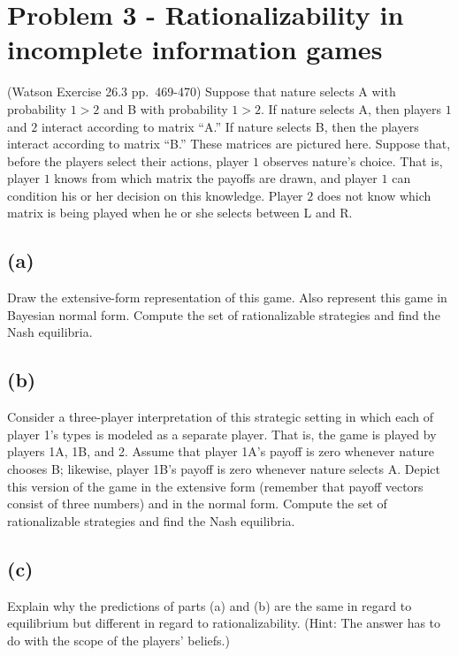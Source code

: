 \documentclass{article}
\begin{document}
\section{Problem 3 - Rationalizability in incomplete information games}

(Watson Exercise 26.3 pp.~469-470)
Suppose that nature selects A with probability $1>2$ and B with probability
$1>2$. If nature selects A, then players $1$ and $2$ interact according to matrix
``A.'' If nature selects B, then the players interact according to matrix ``B.''
These matrices are pictured here. Suppose that, before the players select
their actions, player $1$ observes nature's choice. That is, player $1$ knows
from which matrix the payoffs are drawn, and player $1$ can condition his
or her decision on this knowledge. Player $2$ does not know which matrix is
being played when he or she selects between L and R.

\subsection*{(a)} Draw the extensive-form representation of this game. Also represent
this game in Bayesian normal form. Compute the set of rationalizable
strategies and find the Nash equilibria.



\subsection*{(b)} Consider a three-player interpretation of this strategic setting in which each of player 1's types is modeled as a separate player. That is, the
game is played by players 1A, 1B, and 2. Assume that player 1A's
payoff is zero whenever nature chooses B; likewise, player 1B's payoff
is zero whenever nature selects A. Depict this version of the game in the
extensive form (remember that payoff vectors consist of three numbers)
and in the normal form. Compute the set of rationalizable strategies and
find the Nash equilibria.



\subsection*{(c)} Explain why the predictions of parts (a) and (b) are the same in regard
to equilibrium but different in regard to rationalizability. (Hint: The
answer has to do with the scope of the players' beliefs.)
\end{document}
